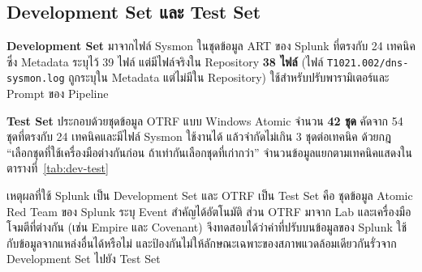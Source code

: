 \subsection{Development Set และ Test Set}
\label{sec:dev-test}
\textbf{Development Set} มาจากไฟล์ Sysmon ในชุดข้อมูล ART ของ Splunk ที่ตรงกับ 24 เทคนิค
ซึ่ง Metadata ระบุไว้ 39 ไฟล์ แต่มีไฟล์จริงใน Repository \textbf{38 ไฟล์}
(ไฟล์ \texttt{T1021.002/dns-sysmon.log} ถูกระบุใน Metadata แต่ไม่มีใน Repository)
ใช้สำหรับปรับพารามิเตอร์และ Prompt ของ Pipeline

\textbf{Test Set} ประกอบด้วยชุดข้อมูล OTRF แบบ Windows Atomic จำนวน \textbf{42 ชุด}
คัดจาก 54 ชุดที่ตรงกับ 24 เทคนิคและมีไฟล์ Sysmon ใช้งานได้
แล้วจำกัดไม่เกิน 3 ชุดต่อเทคนิค ด้วยกฎ ``เลือกชุดที่ใช้เครื่องมือต่างกันก่อน ถ้าเท่ากันเลือกชุดที่เก่ากว่า''
จำนวนข้อมูลแยกตามเทคนิคแสดงในตารางที่~\ref{tab:dev-test}

เหตุผลที่ใช้ Splunk เป็น Development Set และ OTRF เป็น Test Set คือ
ชุดข้อมูล Atomic Red Team ของ Splunk ระบุ Event สำคัญได้อัตโนมัติ
ส่วน OTRF มาจาก Lab และเครื่องมือโจมตีที่ต่างกัน (เช่น Empire และ Covenant)
จึงทดสอบได้ว่าค่าที่ปรับบนข้อมูลของ Splunk ใช้กับข้อมูลจากแหล่งอื่นได้หรือไม่
และป้องกันไม่ให้ลักษณะเฉพาะของสภาพแวดล้อมเดียวกันรั่วจาก Development Set ไปยัง Test Set

